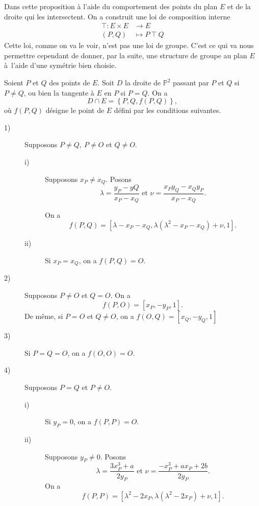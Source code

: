 
Dans cette proposition à l'aide du comportement des points du plan $E$ et de la droite qui les intersectent. On a construit une loi de composition interne
\[
\begin{align*}
    \top : E \times E &\longrightarrow E \\
    (P,Q) &\longmapsto P  \ \top  \ Q
\end{align*}
\] 
Cette loi, comme on va le voir, n'est pas une loi de groupe. C'est ce qui va nous permettre cependant de donner, par la suite, une structure de groupe au plan $E$ à l'aide d'une symétrie bien choisie.

\begin{proposition}
    Soient $P$ et $Q$ des points de $E$. Soit $D$ la droite de $\mathbb{P}^2$ passant par $P$ et $Q$ si $P \neq Q$, ou bien la tangente à $E$ en $P$ si $P = Q$. On a
    \[
    D \cap E = \left\{ P, Q, f(P,Q) \right\}
    ,\] 
    où $f(P,Q)$ désigne le point de $E$ défini par les conditions suivantes.
    \begin{description}
        \item[1)] Supposons $P \neq Q, \ P \neq O$ et $Q \neq O$.
            \begin{description}
                \item[i)] Supposons $x_{P} \neq x_{Q}$. Posons
                    \[
                    \lambda = \frac{y_{P} - y{Q}}{x_{P} - x_{Q}} \text{ et } \nu = \frac{x_{P}y_{Q} - x_{Q}y_{P}}{x_{P} - x_{Q}}
                    .\] 

On a 
\[
f(P,Q) = \left[ \lambda - x_{P} - x_{Q}, \lambda \left( \lambda^2 - x_{P} - x_{Q} \right) + \nu, 1 \right]
.\] 
                \item[ii)] Si $x_{P} = x_{Q}$, on a $f(P,Q) = O$.
            \end{description}
        \item[2)] Supposons $P \neq O$ et $Q = O$. On a
            \[
            f(P,O) = \left[ x_{P}, -y_{P}, 1 \right]
            .\] 
            De même, si $P = O$ et $Q \neq O$, on a $f(O,Q) = \left[ x_{Q}, -y_{Q}, 1 \right]$
        \item[3)] Si $P = Q = O$, on a $f(O,O) = O$.
        \item[4)]  Supposons $P = Q$ et $P \neq O$.
            \begin{description}
                \item[i)] Si $y_{P} = 0$, on a $f(P,P) = O$.
                \item[ii)] Supposons $y_{P} \neq 0$. Posons
                    \[
                    \lambda = \frac{3x_{P}^3 + a}{2y_{P}} \text{ et } \nu = \frac{-x_{P}^3 + ax_{P} + 2b}{2y_{P}}
                    .\] 
On a
\[
f(P,P) = \left[ \lambda^2 - 2 x_{P}, \lambda\left( \lambda^2 - 2x_{P} \right) + \nu, 1 \right]
.\] 
            \end{description}
    \end{description}
\end{proposition}

